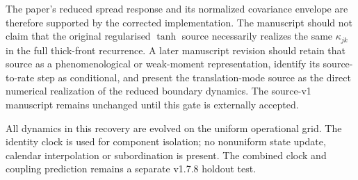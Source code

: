 The paper's reduced spread response and its normalized covariance envelope are
therefore supported by the corrected implementation.  The manuscript should
not claim that the original regularised $\tanh$ source necessarily realizes
the same $\kappa_{jk}$ in the full thick-front recurrence.  A later manuscript
revision should retain that source as a phenomenological or weak-moment
representation, identify its source-to-rate step as conditional, and present
the translation-mode source as the direct numerical realization of the
reduced boundary dynamics.  The source-v1 manuscript remains unchanged until
this gate is externally accepted.

All dynamics in this recovery are evolved on the uniform operational grid.
The identity clock is used for component isolation; no nonuniform state update,
calendar interpolation or subordination is present.  The combined clock and
coupling prediction remains a separate v1.7.8 holdout test.
